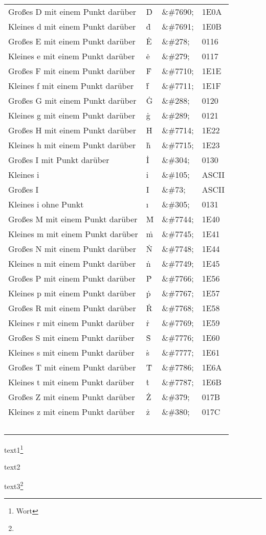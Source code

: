 \documentclass[paper=a5,captions=tableabove]{scrartcl}
\begin{document}
\begin{longtable}{llll}
			Großes D mit einem Punkt darüber&
			Ḋ&
			\&\#7690;&
			1E0A\\
			Kleines d mit einem Punkt darüber&
			ḋ&
			\&\#7691;&
			1E0B\\
			Großes E mit einem Punkt darüber&
			Ė&
			\&\#278;&
			0116\\
			Kleines e mit einem Punkt darüber&
			ė&
			\&\#279;&
			0117\\
			Großes F mit einem Punkt darüber&
			Ḟ&
			\&\#7710;&
			1E1E\\
			Kleines f mit einem Punkt darüber&
			ḟ&
			\&\#7711;&
			1E1F\\
			Großes G mit einem Punkt darüber&
			Ġ&
			\&\#288;&
			0120\\
			Kleines g mit einem Punkt darüber&
			ġ&
			\&\#289;&
			0121\\
			Großes H mit einem Punkt darüber&
			Ḣ&
			\&\#7714;&
			1E22\\
			Kleines h mit einem Punkt darüber&
			ḣ&
			\&\#7715;&
			1E23\\
			Großes I mit Punkt darüber&
			İ&
			\&\#304;&
			0130\\
			Kleines i&
			i&
			\&\#105;&
			ASCII\\
			Großes I&
			I&
			\&\#73;&
			ASCII\\
			Kleines i ohne Punkt&
			ı&
			\&\#305;&
			0131\\
			Großes M mit einem Punkt darüber&
			Ṁ&
			\&\#7744;&
			1E40\\
			Kleines m mit einem Punkt darüber&
			ṁ&
			\&\#7745;&
			1E41\\
			Großes N mit einem Punkt darüber&
			Ṅ&
			\&\#7748;&
			1E44\\
			Kleines n mit einem Punkt darüber&
			ṅ&
			\&\#7749;&
			1E45\\
			Großes P mit einem Punkt darüber&
			Ṗ&
			\&\#7766;&
			1E56\\
			Kleines p mit einem Punkt darüber&
			ṗ&
			\&\#7767;&
			1E57\\
			Großes R mit einem Punkt darüber&
			Ṙ&
			\&\#7768;&
			1E58\\
			Kleines r mit einem Punkt darüber&
			ṙ&
			\&\#7769;&
			1E59\\
			Großes S mit einem Punkt darüber&
			Ṡ&
			\&\#7776;&
			1E60\\
			Kleines s mit einem Punkt darüber&
			ṡ&
			\&\#7777;&
			1E61\\
			Großes T mit einem Punkt darüber&
			Ṫ&
			\&\#7786;&
			1E6A\\
			Kleines t mit einem Punkt darüber&
			ṫ&
			\&\#7787;&
			1E6B\\
			Großes Z mit einem Punkt darüber&
			Ż&
			\&\#379;&
			017B\\
			Kleines z mit einem Punkt darüber&
			ż&
			\&\#380;&
			017C\\\
		\end{longtable}
		
		text1\footnote{\label{wort1}Wort} 
		
		text2
		
		text3\footnote{}%
		
		
		
	
\end{document}
